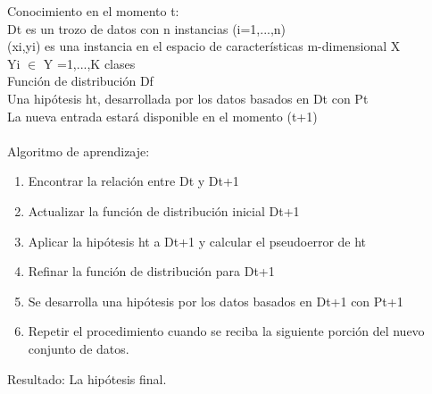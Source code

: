 			Conocimiento en el momento t: \\
			Dt es un trozo de datos con n instancias (i=1,...,n) \\
			(xi,yi) es una instancia en el espacio de características m-dimensional X\\ 
			Yi $\in$ Y ={1,...,K} clases \\
			Función de distribución Df \\
			Una hipótesis ht, desarrollada por los datos basados en Dt con Pt \\
			La nueva entrada estará disponible en el momento (t+1) \\\\
			
			Algoritmo de aprendizaje:\\
			\begin{enumerate}
				\item Encontrar la relación entre Dt y Dt+1
				\item Actualizar la función de distribución inicial Dt+1
				\item Aplicar la hipótesis ht a Dt+1 y calcular el pseudoerror de ht
				\item Refinar la función de distribución para Dt+1
				\item Se desarrolla una hipótesis por los datos basados en Dt+1 con Pt+1
				\item Repetir el procedimiento cuando se reciba la siguiente porción del nuevo conjunto de datos.
			\end{enumerate}
			Resultado: La hipótesis final.\\